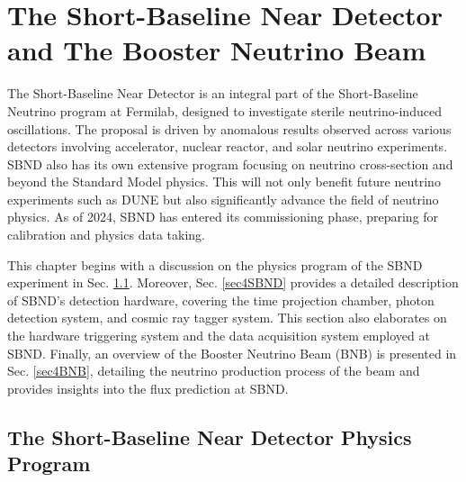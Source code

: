 \chapter{The Short-Baseline Near Detector and The Booster Neutrino Beam}
\label{ChapterDetector}
\ifpdf
    \graphicspath{{Chapter4/Figs/Raster/}{Chapter4/Figs/PDF/}{Chapter4/Figs/}}
\else
    \graphicspath{{Chapter4/Figs/Vector/}{Chapter4/Figs/}}
\fi


The Short-Baseline Near Detector is an integral part of the Short-Baseline Neutrino program at Fermilab, designed to investigate sterile neutrino-induced oscillations. 
The proposal is driven by anomalous results observed across various detectors involving accelerator, nuclear reactor, and solar neutrino experiments.
SBND also has its own extensive program focusing on neutrino cross-section and beyond the Standard Model physics. 
This will not only benefit future neutrino experiments such as DUNE but also significantly advance the field of neutrino physics.
As of 2024, SBND has entered its commissioning phase, preparing for calibration and physics data taking.

This chapter begins with a discussion on the physics program of the SBND experiment in Sec. \ref{sec4PhysicsProgram}. 
Moreover, Sec. \ref{sec4SBND} provides a detailed description of SBND's detection hardware, covering the time projection chamber, photon detection system, and cosmic ray tagger system. 
This section also elaborates on the hardware triggering system and the data acquisition system employed at SBND.
Finally, an overview of the Booster Neutrino Beam (BNB) is presented in Sec. \ref{sec4BNB}, detailing the neutrino production process of the beam and provides insights into the flux prediction at SBND.

\newpage
\section{The Short-Baseline Near Detector Physics Program}
\label{sec4PhysicsProgram}

